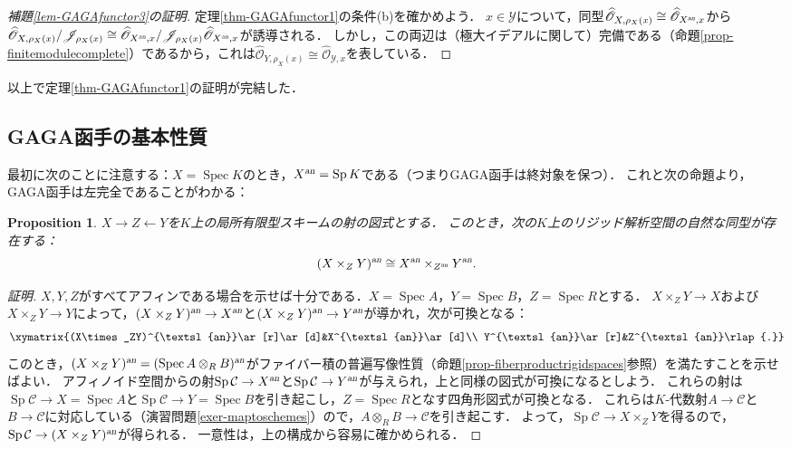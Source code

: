 \documentclass[a4paper,12pt, dvipdfmx]{jsbook}
\def\O{\mathscr{O}}
\def\Spec{\mathop{\mathrm{Spec}}\nolimits}
\def\Sp{\mathop{\mathrm{Sp}}\nolimits}
\def\an{\textsl{an}}
\theoremstyle{plain}
\newtheorem{prop}[thm]{\bfseries Proposition}
\theoremstyle{definition}
\begin{document}
\begin{proof}[{\rm 補題\ref{lem-GAGAfunctor3}の証明}]
定理\ref{thm-GAGAfunctor1}の条件(b)を確かめよう．
$x\in\mathcal{Y}$について，同型$\widehat{\O}_{X,\rho_X(x)}\cong\widehat{\O}_{X^{\an},x}$から$\widehat{\O}_{X,\rho_X(x)}/\mathscr{J}_{\rho_X(x)}\cong\widehat{\O}_{X^{\an},x}/\mathscr{J}_{\rho_X(x)}\widehat{\O}_{X^{\an},x}$が誘導される．
しかし，この両辺は（極大イデアルに関して）完備である（命題\ref{prop-finitemodulecomplete}）であるから，これは$\widehat{\O}_{Y,\rho_X(x)}\cong\widehat{\O}_{\mathcal{Y},x}$を表している．
\end{proof}

以上で定理\ref{thm-GAGAfunctor1}の証明が完結した．

\subsection{GAGA函手の基本性質}\label{sub-propertyGAGAfunctor}
最初に次のことに注意する：$X=\Spec K$のとき，$X^{\an}=\Sp K$である（つまりGAGA函手は終対象を保つ）．
これと次の命題より，GAGA函手は左完全であることがわかる：
\begin{prop}\label{prop-propertyGAGAfunctor1}{\rm 
$X\rightarrow Z\leftarrow Y$を$K$上の局所有限型スキームの射の図式とする．
このとき，次の$K$上のリジッド解析空間の自然な同型が存在する：
$$
(X\times_ZY)^{\an}\cong X^{\an}\times_{Z^{\an}}Y^{\an}.
$$}
\end{prop}

\begin{proof}[証明]
$X,Y,Z$がすべてアフィンである場合を示せば十分である．$X=\Spec A$，$Y=\Spec B$，$Z=\Spec R$とする．
$X\times_ZY\rightarrow X$および$X\times_ZY\rightarrow Y$によって，$(X\times_ZY)^{\an}\rightarrow X^{\an}$と$(X\times_ZY)^{\an}\rightarrow Y^{\an}$が導かれ，次が可換となる：
$$
\xymatrix{(X\times_ZY)^{\an}\ar[r]\ar[d]&X^{\an}\ar[d]\\ Y^{\an}\ar[r]&Z^{\an}\rlap{.}}
$$
このとき，$(X\times_ZY)^{\an}=(\Spec A\otimes_RB)^{\an}$がファイバー積の普遍写像性質（命題\ref{prop-fiberproductrigidspaces}参照）を満たすことを示せばよい．
アフィノイド空間からの射$\Sp\mathcal{C}\rightarrow X^{\an}$と$\Sp\mathcal{C}\rightarrow Y^{\an}$が与えられ，上と同様の図式が可換になるとしよう．
これらの射は$\Sp\mathcal{C}\rightarrow X=\Spec A$と$\Sp\mathcal{C}\rightarrow Y=\Spec B$を引き起こし，$Z=\Spec R$となす四角形図式が可換となる．
これらは$K$-代数射$A\rightarrow\mathcal{C}$と$B\rightarrow\mathcal{C}$に対応している（演習問題\ref{exer-maptoschemes}）ので，$A\otimes_RB\rightarrow\mathcal{C}$を引き起こす．
よって，$\Sp\mathcal{C}\rightarrow X\times_ZY$を得るので，$\Sp\mathcal{C}\rightarrow(X\times_ZY)^{\an}$が得られる．
一意性は，上の構成から容易に確かめられる．
\end{proof}
\end{document}

